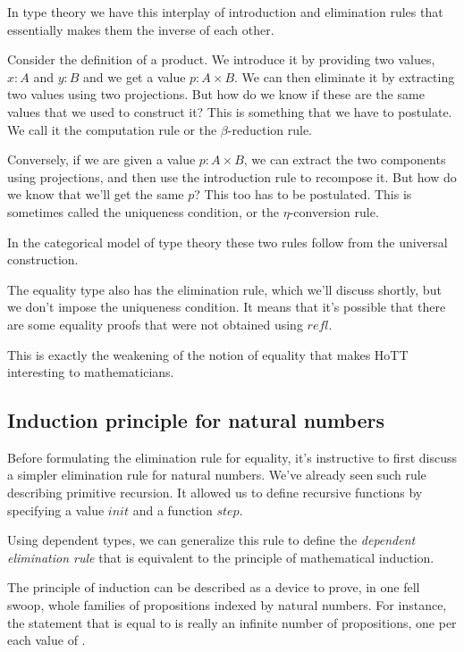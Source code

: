 \documentclass[DaoFP]{subfiles}
\begin{document}
In type theory we have this interplay of introduction and elimination rules that essentially makes them the inverse of each other. 

Consider the definition of a product. We introduce it by providing two values, $x \colon A$ and $y \colon B$ and we get a value $p \colon A \times B$. We can then eliminate it by extracting two values using two projections. But how do we know if these are the same values that we used to construct it? This is something that we have to postulate. We call it the computation rule or the $\beta$-reduction rule.

Conversely, if we are given a value $p \colon A \times B$, we can extract the two components using projections, and then use the introduction rule to recompose it. But how do we know that we'll get the same $p$? This too has to be postulated. This is sometimes called the uniqueness condition, or the $\eta$-conversion rule.

In the categorical model of type theory these two rules follow from the universal construction. 

The equality type also has the elimination rule, which we'll discuss shortly, but we don't impose the uniqueness condition. It means that it's possible that there are some equality proofs that were not obtained using $\mathit{refl}$. 

This is exactly the weakening of the notion of equality that makes HoTT interesting to mathematicians.

\subsection{Induction principle for natural numbers}

Before formulating the elimination rule for equality, it's instructive to first discuss a simpler elimination rule for natural numbers. We've already seen such rule describing primitive recursion. It allowed us to define recursive functions by specifying a value $\mathit{init}$ and a function $\mathit{step}$.

Using dependent types, we can generalize this rule to define the \emph{dependent elimination rule} that is equivalent to the principle of mathematical induction.

The principle of induction can be described as a device to prove, in one fell swoop, whole families of propositions indexed by natural numbers. For instance, the statement that  is equal to  is really an infinite number of propositions, one per each value of . 
\end{document}
